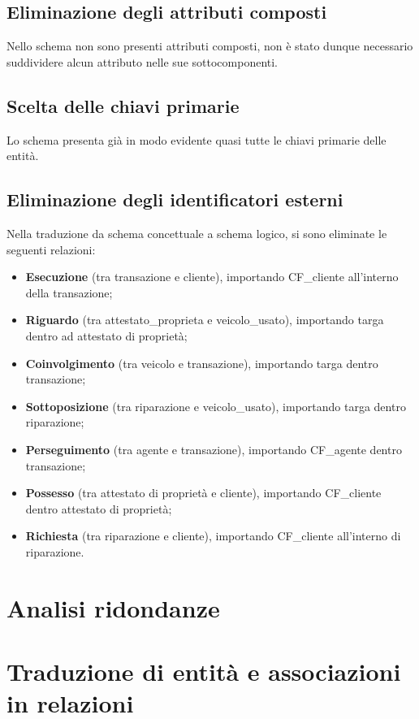 \documentclass[a4paper,12pt]{report}
\begin{document}
\subsection*{Eliminazione degli attributi composti }
Nello schema non sono presenti attributi composti, non è stato dunque necessario suddividere alcun attributo nelle sue sottocomponenti.
\subsection*{Scelta delle chiavi primarie }
Lo schema presenta già in modo evidente quasi tutte le chiavi primarie delle entità.

\subsection*{Eliminazione degli identificatori esterni }
Nella traduzione da schema concettuale a schema logico, si sono eliminate le seguenti relazioni: 

\begin{itemize}
	\item \textbf{Esecuzione} (tra transazione e cliente), importando CF\_cliente all’interno della transazione;
	\item \textbf{Riguardo} (tra attestato\_proprieta e veicolo\_usato), importando targa dentro ad attestato di proprietà;
	\item \textbf{Coinvolgimento} (tra veicolo e transazione), importando targa dentro transazione;
	\item \textbf{Sottoposizione} (tra riparazione e veicolo\_usato), importando targa dentro riparazione;
	\item \textbf{Perseguimento} (tra agente e transazione), importando CF\_agente dentro transazione;
	\item \textbf{Possesso} (tra attestato di proprietà e cliente), importando CF\_cliente dentro attestato di proprietà;
	\item \textbf{Richiesta} (tra riparazione e cliente), importando CF\_cliente all’interno di riparazione.
\end{itemize}

\section{Analisi ridondanze}

\section{Traduzione di entità e associazioni in relazioni}
\end{document}
